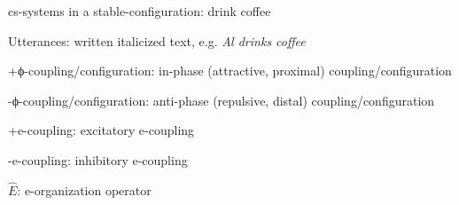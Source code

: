 \noindent cs-systems in a stable-configuration: {\textbar}drink coffee{\textbar}

\noindent Utterances: written italicized text, e.g. \textit{Al drinks coffee}

\noindent +ϕ-coupling/configuration: in-phase (attractive, proximal) coupling/configuration

\noindent {}-ϕ-coupling/configuration: anti-phase (repulsive, distal) coupling/configuration

\noindent +e-coupling: excitatory e-coupling

\noindent {}-e-coupling: inhibitory e-coupling

\noindent $\widehat {{E}}$: e-organization operator
